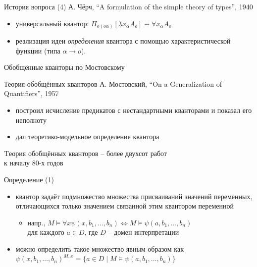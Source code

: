 \documentclass{beamer}
\begin{document}
\begin{frame}{История вопроса (4)}
А. Чёрч, ``A formulation of the simple theory of types'', 1940
\bigskip
\begin{itemize}
    \item универсальный квантор: $\Pi_{o(o\alpha)}[\lambda x_\alpha A_o] \equiv \forall x_\alpha A_o$
    \medskip
    \item реализация идеи \textit{определения} квантора с помощью характеристической функции (типа $\alpha \to o$).
\end{itemize}
\end{frame}


\begin{frame}{}
\begin{center}
Обобщённые кванторы по Мостовскому
\end{center}
\end{frame}

\begin{frame}{Теория обобщённых кванторов}
А. Мостовский, ``On a Generalization of Quantifiers'', 1957
\bigskip
\begin{itemize}
	\item построил исчисление предикатов с нестандартными кванторами и показал его неполноту
	\item дал теоретико-модельное определение квантора
\end{itemize}
\bigskip
\bigskip
Tеория обобщённых кванторов -- более двухсот работ \\к началу 80-х годов
\end{frame}

\begin{frame}{Определение (1)}
\begin{itemize}
    \item квантор задаёт подмножество множества присваиваний значений переменных, отличающихся только значением связанной этим квантором переменной
    \medskip
    \begin{itemize}
        \item напр., $M \models \forall x \psi(x, b_1, \dots, b_n) \Leftrightarrow M \models \psi(a, b_1, \dots, b_n)$ \\для каждого $a \in D$, где $D$ -- домен интерпретации
    \end{itemize}
    \medskip
	\item можно определить такое множество явным образом как $\psi(x, b_1, \dots, b_n)^{M,x} = \{ a \in D \; | \; M \models \psi(a, b_1, \dots, b_n) \}$
\end{itemize}
\end{frame}
\end{document}
